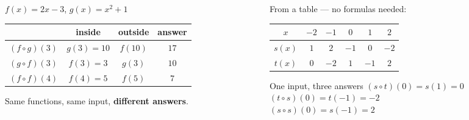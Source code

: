 \documentclass[aspectratio=169, 11pt]{beamer}
\begin{document}
\begin{frame}[t, plain]
  \begin{columns}[T]
    \begin{column}{0.48\textwidth}
      \footnotesize
      $f(x)=2x-3$, \quad $g(x)=x^{2}+1$
      \vspace{4pt}
      \begin{center}
      \renewcommand{\arraystretch}{1.35}
      \begin{tabular}{|l|c|c|c|}
      \hline
      & \textbf{inside} & \textbf{outside} & \textbf{answer} \\ \hline
      $(f\circ g)(3)$ & $g(3)=10$ & $f(10)$ & $17$ \\ \hline
      $(g\circ f)(3)$ & $f(3)=3$ & $g(3)$ & $10$ \\ \hline
      $(f\circ f)(4)$ & $f(4)=5$ & $f(5)$ & $7$ \\ \hline
      \end{tabular}
      \end{center}
      \vspace{4pt}
      Same functions, same input, \textbf{different answers}.
    \end{column}
    \begin{column}{0.48\textwidth}
      \footnotesize
      From a table --- no formulas needed:
      \vspace{3pt}
      \begin{center}
      \renewcommand{\arraystretch}{1.3}
      \begin{tabular}{|c|c|c|c|c|c|}
      \hline
      $x$ & $-2$ & $-1$ & $0$ & $1$ & $2$ \\ \hline
      $s(x)$ & $1$ & $2$ & $-1$ & $0$ & $-2$ \\ \hline
      $t(x)$ & $0$ & $-2$ & $1$ & $-1$ & $2$ \\ \hline
      \end{tabular}
      \end{center}
      \vspace{4pt}
      \begin{block}{One input, three answers}
        $(s\circ t)(0)=s(1)=0$ \\[2pt]
        $(t\circ s)(0)=t(-1)=-2$ \\[2pt]
        $(s\circ s)(0)=s(-1)=2$
      \end{block}
    \end{column}
  \end{columns}
\end{frame}
\end{document}
